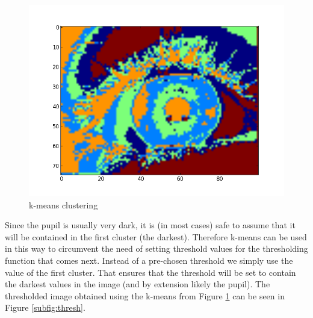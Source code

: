 \begin{figure}[h!]
\centering
\includegraphics[width=\columnwidth]{Handin1/images/k-means.png}
\caption{k-means clustering}
\label{fig:kmeans}
\end{figure}

Since the pupil is usually very dark, it is (in most cases) safe to assume that it will be contained in the first cluster (the darkest). Therefore k-means can be used in this way to circumvent the need of setting threshold values for the thresholding function that comes next. Instead of a pre-chosen threshold we simply use the value of the first cluster. That ensures that the threshold will be set to contain the darkest values in the image (and by extension likely the pupil). The thresholded image obtained using the k-means from Figure \ref{fig:kmeans} can be seen in Figure \ref{subfig:thresh}. 

